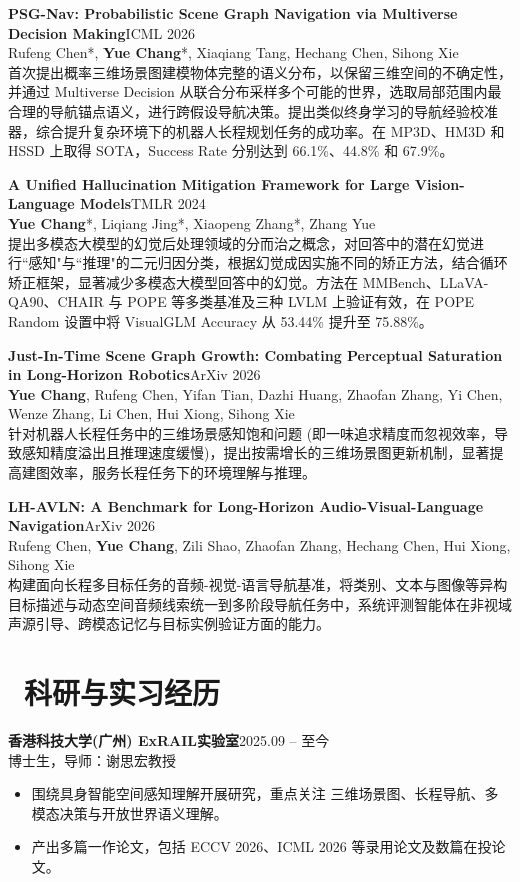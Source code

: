 \documentclass[10pt,a4paper,fontset=fandol]{ctexart}
\newcommand{\paper}[4]{
  \textbf{#1}\hfill #2\\
  #3\\
  {\small #4}
  \vspace{0.08em}
}
\newcommand{\project}[4]{
  \textbf{#1}\hfill #2\\
  {\small #3}
  \begin{itemize}
    #4
  \end{itemize}
}
\begin{document}
\paper{PSG-Nav: Probabilistic Scene Graph Navigation via Multiverse Decision Making}{ICML 2026}
{Rufeng Chen*, \textbf{Yue Chang}*, Xiaqiang Tang, Hechang Chen, Sihong Xie}
{首次提出概率三维场景图建模物体完整的语义分布，以保留三维空间的不确定性，并通过 Multiverse Decision 从联合分布采样多个可能的世界，选取局部范围内最合理的导航锚点语义，进行跨假设导航决策。提出类似终身学习的导航经验校准器，综合提升复杂环境下的机器人长程规划任务的成功率。在 MP3D、HM3D 和 HSSD 上取得 SOTA，Success Rate 分别达到 66.1\%、44.8\% 和 67.9\%。}
\vspace{0.12em}

\paper{A Unified Hallucination Mitigation Framework for Large Vision-Language Models}{TMLR 2024}
{\textbf{Yue Chang}*, Liqiang Jing*, Xiaopeng Zhang*, Zhang Yue}
{提出多模态大模型的幻觉后处理领域的分而治之概念，对回答中的潜在幻觉进行``感知"与``推理"的二元归因分类，根据幻觉成因实施不同的矫正方法，结合循环矫正框架，显著减少多模态大模型回答中的幻觉。方法在 MMBench、LLaVA-QA90、CHAIR 与 POPE 等多类基准及三种 LVLM 上验证有效，在 POPE Random 设置中将 VisualGLM Accuracy 从 53.44\% 提升至 75.88\%。}
\vspace{0.12em}

\paper{Just-In-Time Scene Graph Growth: Combating Perceptual Saturation in Long-Horizon Robotics}{ArXiv 2026}
{\textbf{Yue Chang}, Rufeng Chen, Yifan Tian, Dazhi Huang, Zhaofan Zhang, Yi Chen, Wenze Zhang, Li Chen, Hui Xiong, Sihong Xie}
{针对机器人长程任务中的三维场景感知饱和问题 (即一味追求精度而忽视效率，导致感知精度溢出且推理速度缓慢)，提出按需增长的三维场景图更新机制，显著提高建图效率，服务长程任务下的环境理解与推理。}
\vspace{0.12em}

\paper{LH-AVLN: A Benchmark for Long-Horizon Audio-Visual-Language Navigation}{ArXiv 2026}
{Rufeng Chen, \textbf{Yue Chang}, Zili Shao, Zhaofan Zhang, Hechang Chen, Hui Xiong, Sihong Xie}
{构建面向长程多目标任务的音频-视觉-语言导航基准，将类别、文本与图像等异构目标描述与动态空间音频线索统一到多阶段导航任务中，系统评测智能体在非视域声源引导、跨模态记忆与目标实例验证方面的能力。}

\section{\texorpdfstring{{\normalfont\faBriefcase}\ 科研与实习经历}{科研与实习经历}}
\vspace{0.12em}
\project{香港科技大学(广州) ExRAIL实验室}{2025.09 -- 至今}
{博士生，导师：谢思宏教授}
{
  \item 围绕具身智能空间感知理解开展研究，重点关注 三维场景图、长程导航、多模态决策与开放世界语义理解。
  \item 产出多篇一作论文，包括 ECCV 2026、ICML 2026 等录用论文及数篇在投论文。
}
\vspace{0.12em}
\end{document}
